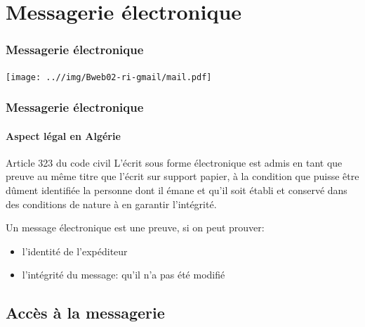 \documentclass[xcolor=table]{beamer}
\begin{document}
\section{Messagerie électronique}

\begin{frame}
\frametitle{Messagerie électronique}

\begin{center}
	\texttt{[image: ..//img/Bweb02-ri-gmail/mail.pdf]}
\end{center}

\end{frame}

\begin{frame}
\frametitle{Messagerie électronique}
\framesubtitle{Aspect légal en Algérie}


\begin{block}{Article 323 du code civil}
	L'écrit sous forme électronique est admis en tant que preuve au même titre que l'écrit sur support papier, à la condition que puisse être dûment identifiée la personne dont il émane et qu’il soit établi et conservé dans des conditions de nature à en garantir l'intégrité.
\end{block}

Un message électronique est une preuve, si on peut prouver: 
\begin{itemize}
	\item l'identité de l'expéditeur 
	\item l'intégrité du message: qu'il n'a pas été modifié 
\end{itemize} 

\end{frame}

\subsection{Accès à la messagerie}
\end{document}
